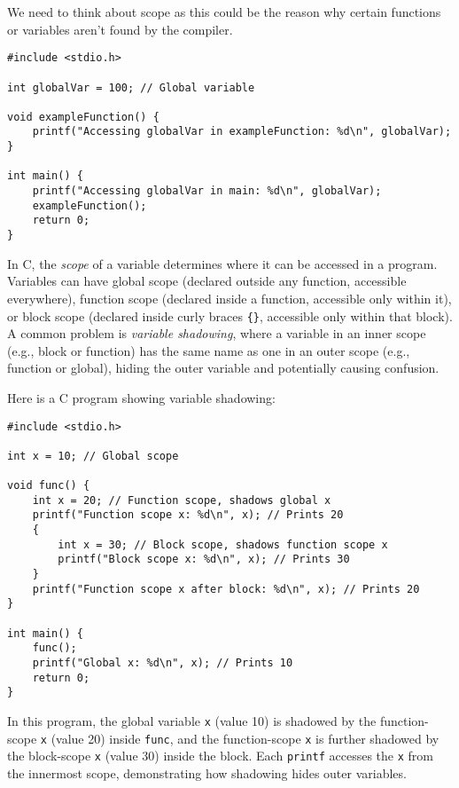 \documentclass[a4paper,12pt]{article}
\begin{document}
\hrulefill

\newpage

We need to think about scope as this could be the reason why certain functions or variables aren't found by the compiler.

\lstset{language=C}
\begin{lstlisting}[caption=Issues with scope]
#include <stdio.h>

int globalVar = 100; // Global variable

void exampleFunction() {
    printf("Accessing globalVar in exampleFunction: %d\n", globalVar);
}

int main() {
    printf("Accessing globalVar in main: %d\n", globalVar);
    exampleFunction();
    return 0;
}\end{lstlisting}

In C, the \textit{scope} of a variable determines where it can be accessed in a program. Variables can have global scope (declared outside any function, accessible everywhere), function scope (declared inside a function, accessible only within it), or block scope (declared inside curly braces \texttt{\{\}}, accessible only within that block). A common problem is \textit{variable shadowing}, where a variable in an inner scope (e.g., block or function) has the same name as one in an outer scope (e.g., function or global), hiding the outer variable and potentially causing confusion.

Here is a C program showing variable shadowing:

\begin{lstlisting}[caption=Variable shadowing]
#include <stdio.h>

int x = 10; // Global scope

void func() {
    int x = 20; // Function scope, shadows global x
    printf("Function scope x: %d\n", x); // Prints 20
    {
        int x = 30; // Block scope, shadows function scope x
        printf("Block scope x: %d\n", x); // Prints 30
    }
    printf("Function scope x after block: %d\n", x); // Prints 20
}

int main() {
    func();
    printf("Global x: %d\n", x); // Prints 10
    return 0;
}
\end{lstlisting}

In this program, the global variable \texttt{x} (value 10) is shadowed by the function-scope \texttt{x} (value 20) inside \texttt{func}, and the function-scope \texttt{x} is further shadowed by the block-scope \texttt{x} (value 30) inside the block. Each \texttt{printf} accesses the \texttt{x} from the innermost scope, demonstrating how shadowing hides outer variables.
\end{document}
